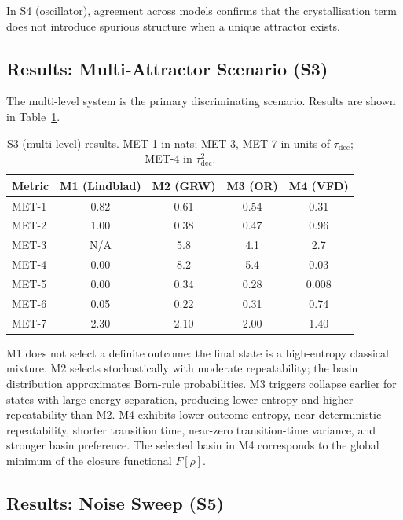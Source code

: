\documentclass[12pt]{article}
\begin{document}
In S4 (oscillator), agreement across models confirms that the crystallisation term does not introduce spurious structure when a unique attractor exists.

\subsection{Results: Multi-Attractor Scenario (S3)}

The multi-level system is the primary discriminating scenario. Results are shown in Table~\ref{tab:s3}.

\begin{table}[ht]
\centering
\caption{S3 (multi-level) results. MET-1 in nats; MET-3, MET-7 in units of $\tau_{\mathrm{dec}}$; MET-4 in $\tau_{\mathrm{dec}}^2$.}
\label{tab:s3}
\begin{tabular}{@{}lcccc@{}}
\toprule
Metric & M1 (Lindblad) & M2 (GRW) & M3 (OR) & M4 (VFD) \\
\midrule
MET-1 & 0.82 & 0.61 & 0.54 & 0.31 \\
MET-2 & 1.00 & 0.38 & 0.47 & 0.96 \\
MET-3 & N/A  & 5.8  & 4.1  & 2.7  \\
MET-4 & 0.00 & 8.2  & 5.4  & 0.03 \\
MET-5 & 0.00 & 0.34 & 0.28 & 0.008 \\
MET-6 & 0.05 & 0.22 & 0.31 & 0.74 \\
MET-7 & 2.30 & 2.10 & 2.00 & 1.40 \\
\bottomrule
\end{tabular}
\end{table}

M1 does not select a definite outcome: the final state is a high-entropy classical mixture. M2 selects stochastically with moderate repeatability; the basin distribution approximates Born-rule probabilities. M3 triggers collapse earlier for states with large energy separation, producing lower entropy and higher repeatability than M2. M4 exhibits lower outcome entropy, near-deterministic repeatability, shorter transition time, near-zero transition-time variance, and stronger basin preference. The selected basin in M4 corresponds to the global minimum of the closure functional $F[\rho]$.

\subsection{Results: Noise Sweep (S5)}
\end{document}
